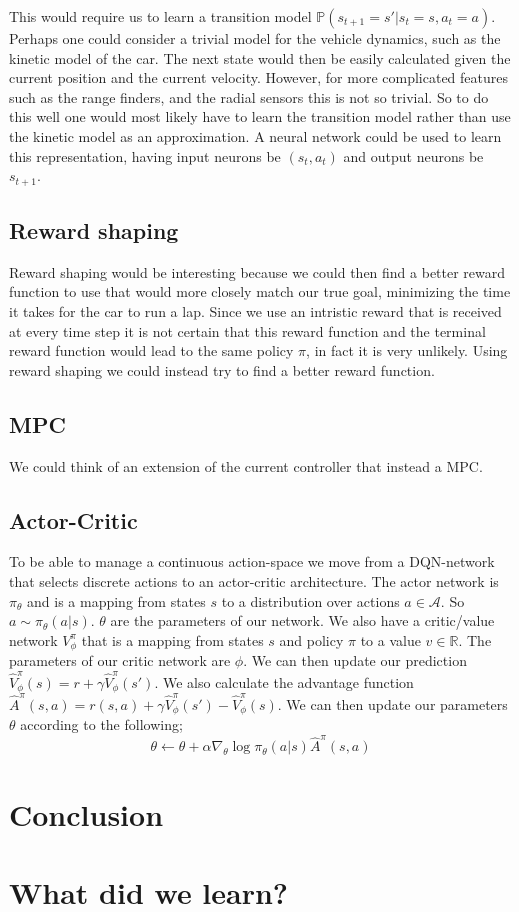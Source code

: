 \documentclass{article}
\begin{document}
This would require us to learn a transition model  $\mathbb{P}(s_{t+1}=s'|s_t=s,a_t=a)$. Perhaps one could consider a trivial model for the vehicle dynamics, such as the kinetic model of the car. The next state would then be easily calculated given the current position and the current velocity. However, for more complicated features such as the range finders, and the radial sensors this is not so trivial. So to do this well one would most likely have to learn the transition model rather than use the kinetic model as an approximation. A neural network could be used to learn this representation, having input neurons be $(s_t,a_t)$ and output neurons be $s_{t+1}$.

\subsection{Reward shaping}

Reward shaping would be interesting because we could then find a better reward function to use that would more closely match our true goal, minimizing the time it takes for the car to run a lap. Since we use an intristic reward that is received at every time step it is not certain that this reward function and the terminal reward function would lead to the same policy $\pi$, in fact it is very unlikely. Using reward shaping we could instead try to find a better reward function.

\subsection{MPC}

We could think of an extension of the current controller that instead a MPC.

\subsection{Actor-Critic}
To be able to manage a continuous action-space we move from a DQN-network that selects discrete actions to an actor-critic architecture. The actor network is $\pi_\theta$ and is a mapping from states $s$ to a distribution over actions $a \in \mathcal{A}$. So $a \sim \pi_\theta(a|s)$. $\theta$ are the parameters of our network. We also have a critic/value network $V_\phi^\pi$ that is a mapping from states $s$ and policy $\pi$ to a value $v \in \mathbb{R}$. The parameters of our critic network are $\phi$.
We can then update our prediction $\hat{V}_\phi^\pi (s)= r + \gamma \hat{V}_\phi^\pi (s')$. We also calculate the advantage function $\hat{A}^\pi (s,a) = r(s,a) + \gamma \hat{V}_\phi^\pi (s') - \hat{V}_\phi^\pi (s).$
We can then update our parameters $\theta$ according to the following;
\[
\theta \leftarrow \theta + \alpha \nabla_\theta \log \pi_\theta (a|s) \hat{A}^\pi (s,a)
\]

\section{Conclusion}

\section{What did we learn?}
\end{document}
